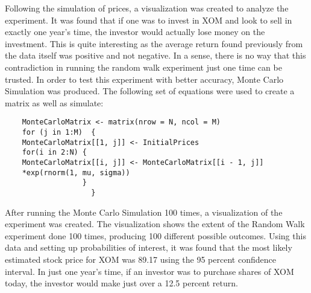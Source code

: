 \documentclass{article}
\begin{document}
Following the simulation of prices, a visualization was created to analyze the experiment. It was found that if one was to invest in XOM and look to sell in exactly one year’s time, the investor would actually lose money on the investment. This is quite interesting as the average return found previously from the data itself was positive and not negative. In a sense, there is no way that this contradiction in running the random walk experiment just one time can be trusted. In order to test this experiment with better accuracy, Monte Carlo Simulation was produced. The following set of equations were used to create a matrix as well as simulate:
\begin{verbatim}
    MonteCarloMatrix <- matrix(nrow = N, ncol = M)
    for (j in 1:M)  {
    MonteCarloMatrix[[1, j]] <- InitialPrices
    for(i in 2:N) {
    MonteCarloMatrix[[i, j]] <- MonteCarloMatrix[[i - 1, j]]
    *exp(rnorm(1, mu, sigma))
                  }
                    }
\end{verbatim}
After running the Monte Carlo Simulation 100 times, a visualization of the experiment was created. The visualization shows the extent of the Random Walk experiment done 100 times, producing 100 different possible outcomes. Using this data and setting up probabilities of interest, it was found that the most likely estimated stock price for XOM was 89.17 using the 95 percent confidence interval. In just one year’s time, if an investor was to purchase shares of XOM today, the investor would make just over a 12.5 percent return.

\newpage
\end{document}
